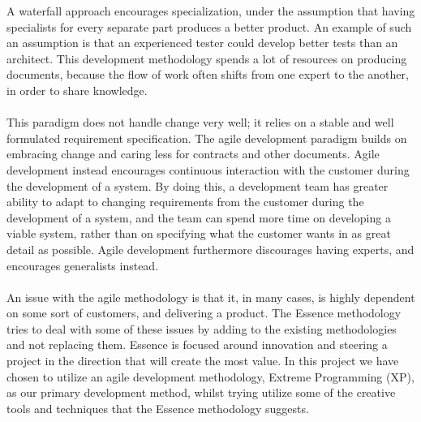 A waterfall approach encourages specialization, under the assumption that having specialists for every separate part produces a better product. An example of such an assumption is that an experienced tester could develop better tests than an architect. This development methodology spends a lot of resources on producing documents, because the flow of work often shifts from one expert to the another, in order to share knowledge. 
\\\\
This paradigm does not handle change very well; it relies on a stable and well formulated requirement specification. The agile development paradigm builds on embracing change and caring less for contracts and other documents. Agile development instead encourages continuous interaction with the customer during the development of a system. By doing this, a development team has greater ability to adapt to changing requirements from the customer during the development of a system, and the team can spend more time on developing a viable system, rather than on specifying what the customer wants in as great detail as possible. Agile development furthermore discourages having experts, and encourages generalists instead.
\\\\
An issue with the agile methodology is that it, in many cases, is highly dependent on some sort of customers, and delivering a product. The Essence methodology tries to deal with some of these issues by adding to the existing methodologies and not replacing them. Essence is focused around innovation and steering a project in the direction that will create the most value. In this project we have chosen to utilize an agile development methodology, Extreme Programming (XP), as our primary development method, whilst trying utilize some of the creative tools and techniques that the Essence methodology suggests. 





